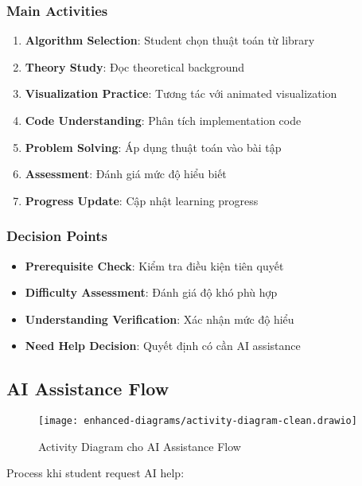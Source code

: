 \subsubsection{Main Activities}

\begin{enumerate}
    \item \textbf{Algorithm Selection}: Student chọn thuật toán từ library
    \item \textbf{Theory Study}: Đọc theoretical background
    \item \textbf{Visualization Practice}: Tương tác với animated visualization
    \item \textbf{Code Understanding}: Phân tích implementation code
    \item \textbf{Problem Solving}: Áp dụng thuật toán vào bài tập
    \item \textbf{Assessment}: Đánh giá mức độ hiểu biết
    \item \textbf{Progress Update}: Cập nhật learning progress
\end{enumerate}

\subsubsection{Decision Points}

\begin{itemize}
    \item \textbf{Prerequisite Check}: Kiểm tra điều kiện tiên quyết
    \item \textbf{Difficulty Assessment}: Đánh giá độ khó phù hợp
    \item \textbf{Understanding Verification}: Xác nhận mức độ hiểu
    \item \textbf{Need Help Decision}: Quyết định có cần AI assistance
\end{itemize}

\subsection{AI Assistance Flow}
\label{subsec:ai-flow}

\begin{figure}[H]
\centering
\texttt{[image: enhanced-diagrams/activity-diagram-clean.drawio]}
\caption{Activity Diagram cho AI Assistance Flow}
\label{fig:activity-ai}
\end{figure}

Process khi student request AI help:

